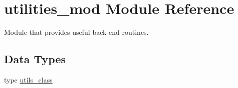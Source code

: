 \hypertarget{namespaceutilities__mod}{}\section{utilities\+\_\+mod Module Reference}
\label{namespaceutilities__mod}


Module that provides useful back-\/end routines.  


\subsection*{Data Types}
\begin{DoxyCompactItemize}
\item 
type \mbox{\hyperlink{structutilities__mod_1_1utils__class}{utils\+\_\+class}}
\end{DoxyCompactItemize}
